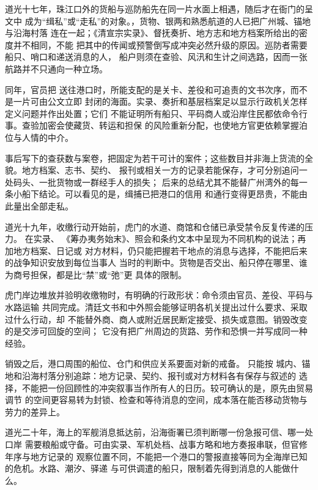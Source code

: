 道光十七年，珠江口外的货船与巡防船先在同一片水面上相遇，随后才在衙门的呈文中
成为“缉私”或“走私”的对象。，货物、银两和熟悉航道的人已把广州城、锚地与沿海村落
连在一起；《清宣宗实录》、督抚奏折、地方志和地方档案所给出的密度并不相同，不能
把其中的传闻或预警倒写成冲突必然升级的原因。巡防者需要船只、哨口和递送消息的人，
船户则须在查验、风汛和生计之间选路，因而一张航路并不只通向一种立场。

同年，官员把
送往港口时，所能支配的是关卡、差役和可追责的文书次序，而不是一片可由公文立即
封闭的海面。实录、奏折和基层档案足以显示行政机关怎样定义问题并作出处置；它们
不能证明所有船只、平码商人或沿岸住民都依命令行事。查验加密会使藏货、转运和担保
的风险重新分配，也使地方官更依赖掌握泊位与人情的中介。

事后写下的查获数与案卷，把固定为若干可计的案件；这些数目并非海上货流的全貌。地方档案、志书、契约、
报刊或相关一方的记录若能保存，才可分别追问一处码头、一批货物或一群经手人的损失；
后来的总结尤其不能替广州湾外的每一条小船下结论。可以看见的是，缉捕已把港口的信用
和通行变得更昂贵，不能由此量出全部走私。

道光十九年，收缴行动开始前，虎门的水道、商馆和仓储已承受禁令反复传递的压力。
在实录、
《筹办夷务始末》、照会和条约文本中呈现为不同机构的说法；再加地方档案、日记或
对方材料，仍只能把握若干地点的消息与选择，不能把后来的战争知识安放到每位当事人
当时的判断中。货物是否交出、船只停在哪里、谁为商号担保，都是比“禁”或“弛”更
具体的限制。

虎门岸边堆放并验明收缴物时，有明确的行政形状：命令须由官员、差役、平码与水路运输
共同完成。清廷文书和中外照会能够证明各机关提出过什么要求、采取过什么行动，却
不能替外商、商人或附近居民断定接受、损失或意图。销毁改变的是交涉可回旋的空间；
它没有把广州周边的货路、劳作和恐惧一并写成同一种经验。

销毁之后，港口周围的船位、仓门和供应关系要面对新的戒备。
只能按
城内、锚地和沿海村落分别追踪：地方记录、契约、报刊或对方材料各有保存与叙述的
选择，不能把一份回顾性的冲突叙事当作所有人的日历。较可确认的是，原先由贸易调节
的空间更容易转为封锁、检查和等待消息的空间，成本落在能否移动货物与劳力的差异上。

道光二十年，海上的军舰消息抵达前，沿海衙署已须判断哪一份急报可信、哪一处口岸
需要粮船或守备。可由实录、军机处档、战事方略和地方奏报串联，但官修年序与地方记录的
观察位置不同，不能把一个港口的警报直接等同为全海岸已知的危机。水路、潮汐、驿递
与可供调遣的船只，限制着先得到消息的人能做什么。

